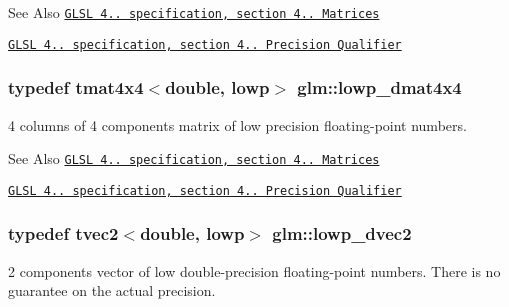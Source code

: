 \begin{DoxySeeAlso}{See Also}
\href{http://www.opengl.org/registry/doc/GLSLangSpec.4.20.8.pdf}{\tt G\-L\-S\-L 4.. specification, section 4.. Matrices} 

\href{http://www.opengl.org/registry/doc/GLSLangSpec.4.20.8.pdf}{\tt G\-L\-S\-L 4.. specification, section 4.. Precision Qualifier} 
\end{DoxySeeAlso}
\hypertarget{group__core__precision_gad9168c20a21d1bfeb0f5d2ddfb98f519}{
\subsubsection[{lowp\-\_\-dmat4x4}]{\setlength{\rightskip}{0pt plus 5cm}typedef tmat4x4$<$double, lowp$>$ {\bf glm\-::lowp\-\_\-dmat4x4}}}\label{group__core__precision_gad9168c20a21d1bfeb0f5d2ddfb98f519}
4 columns of 4 components matrix of low precision floating-\/point numbers.

\begin{DoxySeeAlso}{See Also}
\href{http://www.opengl.org/registry/doc/GLSLangSpec.4.20.8.pdf}{\tt G\-L\-S\-L 4.. specification, section 4.. Matrices} 

\href{http://www.opengl.org/registry/doc/GLSLangSpec.4.20.8.pdf}{\tt G\-L\-S\-L 4.. specification, section 4.. Precision Qualifier} 
\end{DoxySeeAlso}
\hypertarget{group__core__precision_ga26ff2843d850f4f6ad591540e1ff1818}{
\subsubsection[{lowp\-\_\-dvec2}]{\setlength{\rightskip}{0pt plus 5cm}typedef tvec2$<$double, lowp$>$ {\bf glm\-::lowp\-\_\-dvec2}}}\label{group__core__precision_ga26ff2843d850f4f6ad591540e1ff1818}
2 components vector of low double-\/precision floating-\/point numbers. There is no guarantee on the actual precision.


